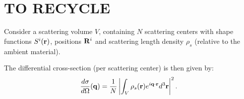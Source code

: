 \section{TO RECYCLE}

Consider a scattering volume $V$, containing $N$ scattering centers with shape functions $S^i(\mathbf{r})$, positions $\mathbf{R}^i$ and scattering length density $\rho_s$ (relative to the ambient material).

The differential cross-section (per scattering center) is then given by:
\begin{equation}\label{eq:xsec1}
  \frac{d\sigma}{d\Omega}(\mathbf{q}) = \frac{1}{N}\left\lvert \int_V \rho_s(\mathbf{r}) e^{i\mathbf{q}\cdot\mathbf{r}} d^3\mathbf{r} \right\rvert ^2.
\end{equation}

